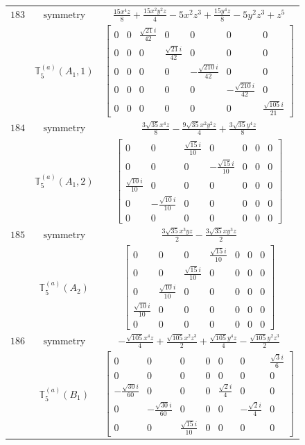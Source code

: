 \documentclass[fleqn,8pt,landscape]{jsarticle}
\begin{document}
\begin{longtable}{ccc}
$ 183 $ & $ \text{symmetry} $ & $ \frac{15 x^{4} z}{8} + \frac{15 x^{2} y^{2} z}{4} - 5 x^{2} z^{3} + \frac{15 y^{4} z}{8} - 5 y^{2} z^{3} + z^{5} $ \\
$  $ & $ \mathbb{T}_{5}^{(a)}(A_{1},1) $ & $ \begin{bmatrix} 0 & 0 & \frac{\sqrt{21} i}{42} & 0 & 0 & 0 & 0 \\ 0 & 0 & 0 & \frac{\sqrt{21} i}{42} & 0 & 0 & 0 \\ 0 & 0 & 0 & 0 & - \frac{\sqrt{210} i}{42} & 0 & 0 \\ 0 & 0 & 0 & 0 & 0 & - \frac{\sqrt{210} i}{42} & 0 \\ 0 & 0 & 0 & 0 & 0 & 0 & \frac{\sqrt{105} i}{21} \end{bmatrix} $ \\ \hline
$ 184 $ & $ \text{symmetry} $ & $ \frac{3 \sqrt{35} x^{4} z}{8} - \frac{9 \sqrt{35} x^{2} y^{2} z}{4} + \frac{3 \sqrt{35} y^{4} z}{8} $ \\
$  $ & $ \mathbb{T}_{5}^{(a)}(A_{1},2) $ & $ \begin{bmatrix} 0 & 0 & \frac{\sqrt{15} i}{10} & 0 & 0 & 0 & 0 \\ 0 & 0 & 0 & - \frac{\sqrt{15} i}{10} & 0 & 0 & 0 \\ \frac{\sqrt{10} i}{10} & 0 & 0 & 0 & 0 & 0 & 0 \\ 0 & - \frac{\sqrt{10} i}{10} & 0 & 0 & 0 & 0 & 0 \\ 0 & 0 & 0 & 0 & 0 & 0 & 0 \end{bmatrix} $ \\ \hline
$ 185 $ & $ \text{symmetry} $ & $ \frac{3 \sqrt{35} x^{3} y z}{2} - \frac{3 \sqrt{35} x y^{3} z}{2} $ \\
$  $ & $ \mathbb{T}_{5}^{(a)}(A_{2}) $ & $ \begin{bmatrix} 0 & 0 & 0 & \frac{\sqrt{15} i}{10} & 0 & 0 & 0 \\ 0 & 0 & \frac{\sqrt{15} i}{10} & 0 & 0 & 0 & 0 \\ 0 & \frac{\sqrt{10} i}{10} & 0 & 0 & 0 & 0 & 0 \\ \frac{\sqrt{10} i}{10} & 0 & 0 & 0 & 0 & 0 & 0 \\ 0 & 0 & 0 & 0 & 0 & 0 & 0 \end{bmatrix} $ \\ \hline
$ 186 $ & $ \text{symmetry} $ & $ - \frac{\sqrt{105} x^{4} z}{4} + \frac{\sqrt{105} x^{2} z^{3}}{2} + \frac{\sqrt{105} y^{4} z}{4} - \frac{\sqrt{105} y^{2} z^{3}}{2} $ \\
$  $ & $ \mathbb{T}_{5}^{(a)}(B_{1}) $ & $ \begin{bmatrix} 0 & 0 & 0 & 0 & 0 & 0 & \frac{\sqrt{3} i}{6} \\ 0 & 0 & 0 & 0 & 0 & 0 & 0 \\ - \frac{\sqrt{30} i}{60} & 0 & 0 & 0 & \frac{\sqrt{2} i}{4} & 0 & 0 \\ 0 & - \frac{\sqrt{30} i}{60} & 0 & 0 & 0 & - \frac{\sqrt{2} i}{4} & 0 \\ 0 & 0 & \frac{\sqrt{15} i}{10} & 0 & 0 & 0 & 0 \end{bmatrix} $ \\ \hline

\end{longtable}
\end{document}
